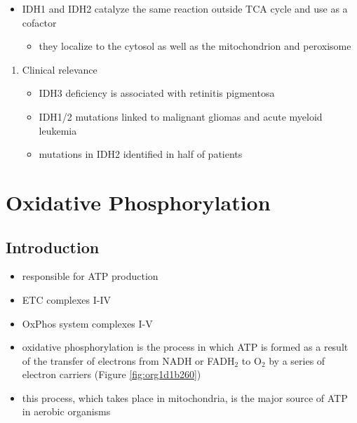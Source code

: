 \documentclass{scrartcl}
\begin{document}

\begin{itemize}
\item IDH1 and IDH2 catalyze the same reaction outside TCA cycle and use
 as a cofactor
\begin{itemize}
\item they localize to the cytosol as well as the mitochondrion and peroxisome
\end{itemize}
\end{itemize}


\begin{enumerate}
\item Clinical relevance
\label{sec:orgc8bc5d9}
\begin{itemize}
\item IDH3 deficiency is associated with retinitis pigmentosa
\item IDH1/2 mutations linked to malignant gliomas and acute myeloid leukemia
\item mutations in IDH2 identified in half of patients
\end{itemize}
\end{enumerate}
\section{Oxidative Phosphorylation}
\label{sec:org41f29c0}
\subsection{Introduction}
\label{sec:orgd92668e}
\begin{itemize}
\item responsible for ATP production
\item ETC complexes I-IV
\item OxPhos system complexes I-V
\item oxidative phosphorylation is the process in which ATP is formed as a
result of the transfer of electrons from NADH or FADH\(_{\text{2}}\) to O\(_{\text{2}}\) by a
series of electron carriers (Figure \ref{fig:org1d1b260})
\item this process, which takes place in mitochondria, is the major source
of ATP in aerobic organisms
\end{itemize}
\end{document}
